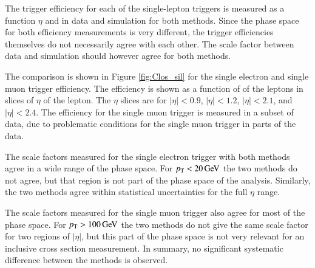 The trigger efficiency for each of the single-lepton triggers is measured as a function $\eta$ and \pt in data and simulation for both methods.
Since the phase space for both efficiency measurements is very different, the trigger efficiencies themselves do not necessarily agree with each other.
The scale factor between data and simulation should however agree for both methods.

The comparison is shown in Figure \ref{fig:Clos_sil} for the single electron and single muon trigger efficiency. The efficiency is shown as a function of \pt of the leptons in slices of $\eta$ of the lepton.
The $\eta$ slices are for $|\eta|<0.9$, $|\eta|<1.2$, $|\eta|<2.1$, and $|\eta|<2.4$.
The efficiency for the single muon trigger is measured in a subset of data, due to problematic conditions for the single muon trigger in parts of the data.

The scale factors measured for the single electron trigger with both methods agree in a wide range of the phase space. For $p_{\mathrm{T}} < 20 \,\text{Ge\hspace{-.08em}V}$ the two methods do not agree, but that region is not part of the phase space of the analysis.
Similarly, the two methods agree within statistical uncertainties for the full $\eta$ range.

The scale factors measured for the single muon trigger also agree for most of the phase space. For $p_{\mathrm{T}} > 100 \,\text{Ge\hspace{-.08em}V}$ the two methods do not give the same scale factor for two regions of $|\eta|$, but this part of the phase space
is not very relevant for an inclusive \ttbar cross section measurement.
In summary, no significant systematic difference between the methods is observed.


